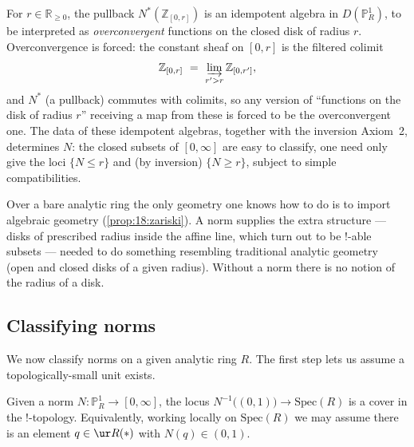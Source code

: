 \begin{remark}
\label{rmk:20:overconvergent-disks}
For $r\in\mathbb R_{\ge0}$, the pullback $N^*(\mathbb Z_{[0,r]})$ is an idempotent
algebra in $D(\mathbb P^1_R)$, to be interpreted as \emph{overconvergent}
functions on the closed disk of radius $r$. Overconvergence is forced: the
constant sheaf on $[0,r]$ is the filtered colimit
\begin{equation*}
\mathbb Z_{[0,r]}\ =\ \varinjlim_{r'>r}\mathbb Z_{[0,r']},
\end{equation*}
and $N^*$ (a pullback) commutes with colimits, so any version of ``functions on
the disk of radius $r$'' receiving a map from these is forced to be the
overconvergent one. The data of these idempotent algebras, together with the
inversion Axiom~2, determines $N$: the closed subsets of $[0,\infty]$ are easy to
classify, one need only give the loci $\{N\le r\}$ and (by inversion)
$\{N\ge r\}$, subject to simple compatibilities.
\end{remark}

\begin{remark}
\label{rmk:20:why-norms}
Over a bare analytic ring the only geometry one knows how to do is to import
algebraic geometry (\cref{prop:18:zariski}). A norm supplies the extra structure
--- disks of prescribed radius inside the affine line, which turn out to be
$!$-able subsets --- needed to do something resembling traditional analytic
geometry (open and closed disks of a given radius). Without a norm there is no
notion of the radius of a disk.
\end{remark}

\subsection{Classifying norms}
\label{subsec:20:classifying}

We now classify norms on a given analytic ring $R$. The first step lets us assume
a topologically-small unit exists.

\begin{lemma}
\label{lem:20:small-element}
Given a norm $N\colon\mathbb P^1_R\to[0,\infty]$, the locus $N^{-1}\bigl((0,1)
\bigr)\to\mathrm{Spec}(R)$ is a cover in the $!$-topology. Equivalently, working
locally on $\mathrm{Spec}(R)$ we may assume there is an element $q\in\ur R(\ast)$
with $N(q)\in(0,1)$.
\end{lemma}

